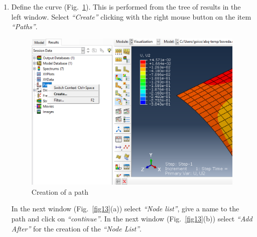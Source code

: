\documentclass[english,a4paper,12pt]{article}
\begin{document}
\begin{enumerate}
\item 
Define the curve
(Fig.~\ref{fig11}). 
This is performed from the tree of results in the left window.
Select \emph{``Create''} clicking with the right mouse button on the item \emph{``Paths''}.
\begin{figure}[h!tp]
\centering
	\includegraphics[scale=0.45]{capturas2019/a_fig35.png}
  \caption{Creation of a path}
  \label{fig11}
\end{figure}
In the next window
(Fig.~\ref{fig13}(a)) 
select  \emph{``Node list''}, give a name to the path and click on \emph{``continue''}.
In the next window (Fig.~\ref{fig13}(b)) select \emph{``Add After''} for the creation of the \emph{``Node List''}.
\begin{figure}[h!tp]
\centering

\end{figure}
\end{enumerate}
\end{document}

